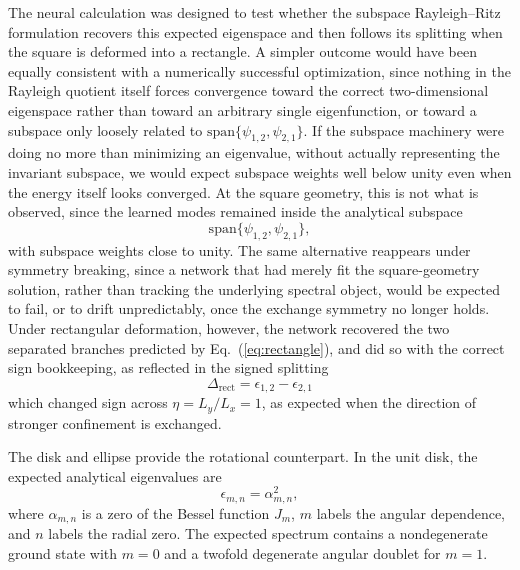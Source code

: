 \documentclass[10pt,onecolumn]{article}
\begin{document}
The neural calculation was designed to test whether the subspace Rayleigh--Ritz formulation recovers this expected eigenspace and then follows its splitting when the square is deformed into a rectangle. A simpler outcome would have been equally consistent with a numerically successful optimization, since nothing in the Rayleigh quotient itself forces convergence toward the correct two-dimensional eigenspace rather than toward an arbitrary single eigenfunction, or toward a subspace only loosely related to $\mathrm{span}\{\psi_{1,2},\psi_{2,1}\}$. If the subspace machinery were doing no more than minimizing an eigenvalue, without actually representing the invariant subspace, we would expect subspace weights well below unity even when the energy itself looks converged. At the square geometry, this is not what is observed, since the learned modes remained inside the analytical subspace
\[
\mathrm{span}\{\psi_{1,2},\psi_{2,1}\},
\]
with subspace weights close to unity. The same alternative reappears under symmetry breaking, since a network that had merely fit the square-geometry solution, rather than tracking the underlying spectral object, would be expected to fail, or to drift unpredictably, once the exchange symmetry no longer holds. Under rectangular deformation, however, the network recovered the two separated branches predicted by Eq.~(\ref{eq:rectangle}), and did so with the correct sign bookkeeping, as reflected in the signed splitting
\begin{equation}
\Delta_{\mathrm{rect}}
=
\epsilon_{1,2}-\epsilon_{2,1}
\end{equation}
which changed sign across $\eta=L_y/L_x=1$, as expected when the direction of stronger confinement is exchanged.

The disk and ellipse provide the rotational counterpart. In the unit disk, the expected analytical eigenvalues are
\begin{equation}
\epsilon_{m,n}=\alpha_{m,n}^{2},
\end{equation}
where $\alpha_{m,n}$ is a zero of the Bessel function $J_m$, $m$ labels the angular dependence, and $n$ labels the radial zero. The expected spectrum contains a nondegenerate ground state with $m=0$ and a twofold degenerate angular doublet for $m=1$.
\end{document}
